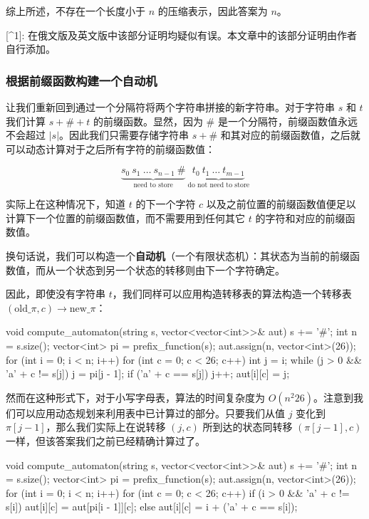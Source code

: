 综上所述，不存在一个长度小于 $n$ 的压缩表示，因此答案为 $n$。

[^1]: 在俄文版及英文版中该部分证明均疑似有误。本文章中的该部分证明由作者自行添加。

\subsubsection{根据前缀函数构建一个自动机}

让我们重新回到通过一个分隔符将两个字符串拼接的新字符串。对于字符串 $s$ 和 $t$ 我们计算 $s + \# + t$ 的前缀函数。显然，因为 $\#$ 是一个分隔符，前缀函数值永远不会超过 $|s|$。因此我们只需要存储字符串 $s + \#$ 和其对应的前缀函数值，之后就可以动态计算对于之后所有字符的前缀函数值：

$$
\underbrace{s_0 ~ s_1 ~ \dots ~ s_{n-1} ~ \#}_{\text{need to store}} ~ \underbrace{t_0 ~ t_1 ~ \dots ~ t_{m-1}}_{\text{do not need to store}}
$$

实际上在这种情况下，知道 $t$ 的下一个字符 $c$ 以及之前位置的前缀函数值便足以计算下一个位置的前缀函数值，而不需要用到任何其它 $t$ 的字符和对应的前缀函数值。

换句话说，我们可以构造一个\textbf{自动机}（一个有限状态机）：其状态为当前的前缀函数值，而从一个状态到另一个状态的转移则由下一个字符确定。

因此，即使没有字符串 $t$，我们同样可以应用构造转移表的算法构造一个转移表 $(\text{old_\(\pi\)}, c) \rightarrow \text{new_\(\pi\)}$：

\begin{cppcode}
void compute_automaton(string s, vector<vector<int>>& aut) {
  s += '#';
  int n = s.size();
  vector<int> pi = prefix_function(s);
  aut.assign(n, vector<int>(26));
  for (int i = 0; i < n; i++) {
    for (int c = 0; c < 26; c++) {
      int j = i;
      while (j > 0 && 'a' + c != s[j]) j = pi[j - 1];
      if ('a' + c == s[j]) j++;
      aut[i][c] = j;
    }
  }
}
\end{cppcode}

然而在这种形式下，对于小写字母表，算法的时间复杂度为 $O(n^2 26)$。注意到我们可以应用动态规划来利用表中已计算过的部分。只要我们从值 $j$ 变化到 $\pi[j - 1]$，那么我们实际上在说转移 $(j, c)$ 所到达的状态同转移 $(\pi[j - 1], c)$ 一样，但该答案我们之前已经精确计算过了。

\begin{cppcode}
void compute_automaton(string s, vector<vector<int>>& aut) {
  s += '#';
  int n = s.size();
  vector<int> pi = prefix_function(s);
  aut.assign(n, vector<int>(26));
  for (int i = 0; i < n; i++) {
    for (int c = 0; c < 26; c++) {
      if (i > 0 && 'a' + c != s[i])
        aut[i][c] = aut[pi[i - 1]][c];
      else
        aut[i][c] = i + ('a' + c == s[i]);
    }
  }
}
\end{cppcode}

